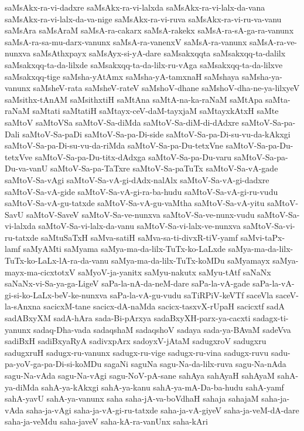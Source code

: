 {saMsAkx-ra-vi-dadxre
saMsAkx-ra-vi-lalxda
saMsAkx-ra-vi-lalx-da-vana
saMsAkx-ra-vi-lalx-da-va-nige
saMsAkx-ra-vi-ruva
saMsAkx-ra-vi-ru-va-vanu
saMsAra
saMsAraM
saMsA-ra-cakarx
saMsA-rakekx
saMsA-ra-sA-ga-ra-vanunx
saMsA-ra-sa-mu-darx-vanunx
saMsA-ra-vanenxV
saMsA-ra-vanunx
saMsA-ra-ve-nunxva
saMsAthxpayx
saMsAyx-si-yA-dare
saMsakxqqta
saMsakxqq-ta-dalilx
saMsakxqq-ta-da-lilxde
saMsakxqq-ta-da-lilx-ru-vAga
saMsakxqq-ta-da-lilxve
saMsakxqq-tige
saMsha-yAtAmx
saMsha-yA-tamxnaH
saMshaya
saMsha-ya-vanunx
saMsheV-rata
saMsheV-rateV
saMshoV-dhane
saMshoV-dha-ne-ya-lilxyeV
saMsithx-tAnAM
saMsithxtiH
saMtAna
saMtA-na-ka-raNaM
saMtApa
saMta-raNaM
saMtati
saMtatiH
saMtayx-ceV-daM-tayxjaM
saMtayxkAtxH
saMte
saMtoV
saMtoVSa
saMtoV-Sa-diMda
saMtoV-Sa-diM-di-dAdxre
saMtoV-Sa-pa-Dali
saMtoV-Sa-paDi
saMtoV-Sa-pa-Di-side
saMtoV-Sa-pa-Di-su-vu-da-kAkxgi
saMtoV-Sa-pa-Di-su-vu-da-riMda
saMtoV-Sa-pa-Du-tetxVne
saMtoV-Sa-pa-Du-tetxVve
saMtoV-Sa-pa-Du-titx-dAdxga
saMtoV-Sa-pa-Du-varu
saMtoV-Sa-pa-Du-va-vanU
saMtoV-Sa-pa-TaTxre
saMtoV-Sa-paTuTx
saMtoV-Sa-vA-gade
saMtoV-Sa-vAgi
saMtoV-Sa-vA-gi-dAdx-nalAlx
saMtoV-Sa-vA-gi-dadxre
saMtoV-Sa-vA-gide
saMtoV-Sa-vA-gi-ra-ba-hudu
saMtoV-Sa-vA-gi-ru-vudu
saMtoV-Sa-vA-gu-tatxde
saMtoV-Sa-vA-gu-vaMtha
saMtoV-Sa-vA-yitu
saMtoV-SavU
saMtoV-SaveV
saMtoV-Sa-ve-nunxva
saMtoV-Sa-ve-nunx-vudu
saMtoV-Sa-vi-lalxda
saMtoV-Sa-vi-lalx-da-vanu
saMtoV-Sa-vi-lalx-ve-nunxva
saMtoV-Sa-vi-ru-tatxde
saMtuSaTxH
saMva-satiH
saMva-sa-ti-divxR-tiV-yamf
saMvi-taPx-lamf
saMyAMti
saMyama
saMya-ma-da-lilx-TuTx-ko-LaLxde
saMya-ma-da-lilx-TuTx-ko-LaLx-lA-ra-da-vanu
saMya-ma-da-lilx-TuTx-koMDu
saMyamayx
saMya-mayx-ma-cicxtotxV
saMyoV-ja-yanitx
saMyu-nakutx
saMyu-tAtf
saNaNx
saNaNx-vi-Sa-ya-ga-LigeV
saPa-la-nA-da-neM-dare
saPa-la-vA-gade
saPa-la-vA-gi-si-ko-LaLx-beV-ke-nunxva
saPa-la-vA-gu-vudu
saTiRPiV-keVTf
saceVla
saceV-la-sAnxna
sacicxM-tane
sacicx-dA-naMda
sacicx-tasxvX-rUpaH
sacicxtf
sadA
sadABxyXM
sadA-hAra
sada-Bi-pArxya
sadaBxyXH-parx-ya-cacxti
sadagx-ti-yanunx
sadaq-Dha-vada
sadaqshaM
sadaqshoV
sadaya
sada-ya-BAvaM
sadeVva
sadiBxH
sadiBxyaRyA
sadivxpArx
sadoyxV-jAtaM
sadugxroV
sadugxru
sadugxruH
sadugx-ru-vanunx
sadugx-ru-vige
sadugx-ru-vina
sadugx-ruvu
sadu-pa-yoV-ga-pa-Di-si-koMDu
sagaNi
saguNa
sagu-Na-da-lilx-ruva
sagu-Na-nAda
sagu-Na-vAda
sagu-Na-vAgi
sagu-NoV-pA-sane
sahAya
sahAyaH
sahAyaM
sahA-ya-diMda
sahA-ya-kAkxgi
sahA-ya-kanu
sahA-ya-mA-Da-ba-hudu
sahA-yamf
sahA-yavU
sahA-ya-vanunx
saha
saha-jA-va-boVdhaH
sahaja
sahajaM
saha-ja-vAda
saha-ja-vAgi
saha-ja-vA-gi-ru-tatxde
saha-ja-vA-giyeV
saha-ja-veM-dA-dare
saha-ja-veMdu
saha-javeV
saha-kA-ra-vanUnx
saha-kAri
}
